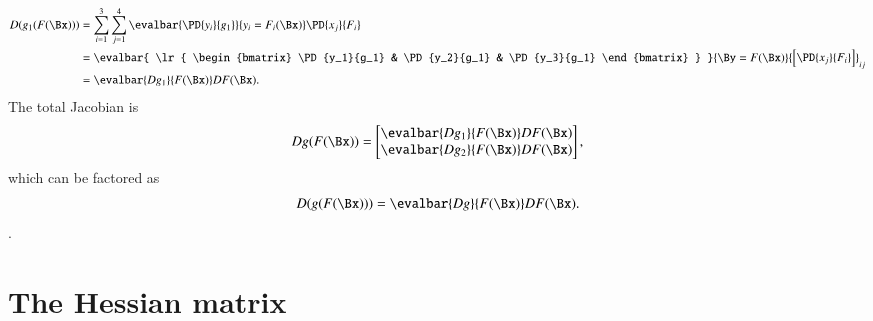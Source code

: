 %
\begin{equation}\label{eqn:jacobianAndHessian:1004}
\begin{aligned}
D (g_1(F(\Bx)))
&=
\sum_{i=1}^3 \sum_{j= 1}^4 \evalbar{\PD{y_i}{g_1}}{y_i = F_i(\Bx)} \PD{x_j}{F_i} \\
&=
\evalbar{
   \lr{
      \begin{bmatrix}
      \PD{y_1}{g_1} & \PD{y_2}{g_1} & \PD{y_3}{g_1}
      \end{bmatrix}
   }
}{\By = F(\Bx)}
{\begin{bmatrix}
\PD{x_j}{F_i}
\end{bmatrix}}_{ij} \\
&=
\evalbar{D g_1}{F(\Bx)}
D F(\Bx).
\end{aligned}
\end{equation}
%
The total Jacobian is
\begin{equation}\label{eqn:jacobianAndHessian:1024}
D g(F(\Bx))
=
\begin{bmatrix}
\evalbar{D g_1}{F(\Bx)} D F(\Bx) \\
\evalbar{D g_2}{F(\Bx)} D F(\Bx)
\end{bmatrix},
\end{equation}
%
which can be factored as
\begin{equation}\label{eqn:jacobianAndHessian:1044}
D (g(F(\Bx)))
=
\evalbar{D g}{F(\Bx)} D F(\Bx).
\end{equation}.
%
\section{The Hessian matrix}


